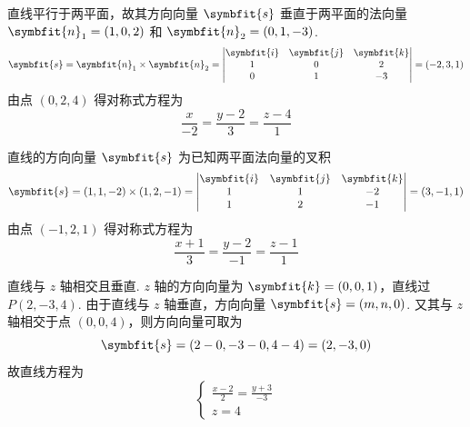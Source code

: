 \begin{solution}
    直线平行于两平面，故其方向向量 $\symbfit{s}$ 垂直于两平面的法向量 $\symbfit{n}_1 = (1, 0, 2)$ 和 $\symbfit{n}_2 = (0, 1, -3)$.
    \begin{equation}
        \symbfit{s} = \symbfit{n}_1 \times \symbfit{n}_2 =
        \begin{vmatrix}
            \symbfit{i} & \symbfit{j} & \symbfit{k} \\
            1           & 0           & 2           \\
            0           & 1           & -3
        \end{vmatrix} = (-2, 3, 1)
    \end{equation}
    由点 $(0, 2, 4)$ 得对称式方程为
    \begin{equation}
        \boxed{\frac{x}{-2} = \frac{y-2}{3} = \frac{z-4}{1}}
    \end{equation}

    直线的方向向量 $\symbfit{s}$ 为已知两平面法向量的叉积
    \begin{equation}
        \symbfit{s} = (1, 1, -2) \times (1, 2, -1) =
        \begin{vmatrix}
            \symbfit{i} & \symbfit{j} & \symbfit{k} \\
            1           & 1           & -2          \\
            1           & 2           & -1
        \end{vmatrix} = (3, -1, 1)
    \end{equation}
    由点 $(-1, 2, 1)$ 得对称式方程为
    \begin{equation}
        \boxed{\frac{x+1}{3} = \frac{y-2}{-1} = \frac{z-1}{1}}
    \end{equation}

    直线与 $z$ 轴相交且垂直. $z$ 轴的方向向量为 $\symbfit{k} = (0, 0, 1)$，直线过 $P(2, -3, 4)$.
    由于直线与 $z$ 轴垂直，方向向量 $\symbfit{s} = (m, n, 0)$. 又其与 $z$ 轴相交于点 $(0, 0, 4)$，则方向向量可取为
    \begin{equation}
        \symbfit{s} = (2-0, -3-0, 4-4) = (2, -3, 0)
    \end{equation}
    故直线方程为
    \begin{equation}
        \boxed{\begin{cases} \frac{x-2}{2} = \frac{y+3}{-3} \\ z = 4 \end{cases}}
    \end{equation}


\end{solution}
